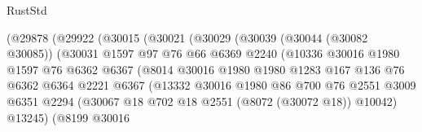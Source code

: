 \begin{lexlean}{RustStd}
\begin{coremodule}
                          (@29878
                            (@29922
                              (@30015
                                (@30021
                                  (@30029
                                    (@30039
                                      (@30044 (@30082 @30085))
                                      (@30031
                                        @1597
                                        @97
                                        @76
                                        @66
                                        @6369
                                        @2240
                                        (@10336
                                          @30016
                                          @1980
                                          @1597
                                          @76
                                          @6362
                                          @6367
                                          (@8014
                                            @30016
                                            @1980
                                            @1980
                                            @1283
                                            @167
                                            @136
                                            @76
                                            @6362
                                            @6364
                                            @2221
                                            @6367
                                            (@13332
                                              @30016
                                              @1980
                                              @86
                                              @700
                                              @76
                                              @2551
                                              @3009
                                              @6351
                                              @2294
                                              (@30067
                                                @18
                                                @702
                                                @18
                                                @2551
                                                (@8072 (@30072 @18))
                                                @10042)
                                              @13245)
                                            (@8199
                                              @30016

\end{coremodule}
\end{lexlean}
